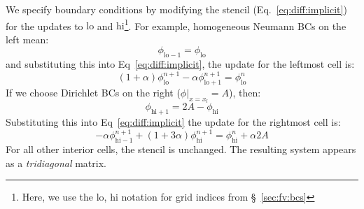 We specify boundary conditions by modifying the stencil
(Eq.~\ref{eq:diff:implicit}) for the updates to $\mathrm{lo}$ and
$\mathrm{hi}$\footnote{Here, we use the $\mathrm{lo}$, $\mathrm{hi}$
  notation for grid indices from \S~\ref{sec:fv:bcs}}.  For example, homogeneous
Neumann BCs on the left mean:
\begin{equation}
\phi_\mathrm{lo-1} = \phi_\mathrm{lo}
\end{equation}
and substituting this into Eq~\ref{eq:diff:implicit}, the update for the leftmost cell is:
\begin{equation}
 (1 + \alpha) \phi_\mathrm{lo}^{n+1} -\alpha \phi_\mathrm{lo+1}^{n+1}  = 
  \phi_\mathrm{lo}^n
\end{equation}
If we choose Dirichlet BCs on the right ($\phi |_{x=x_l} = A$), then:
\begin{equation}
\phi_\mathrm{hi+1} = 2 A - \phi_\mathrm{hi}
\end{equation}
Substituting this into Eq~\ref{eq:diff:implicit} the update for the rightmost cell is:
\begin{equation}
- \alpha \phi_\mathrm{hi-1}^{n+1} + (1 + 3\alpha) \phi_\mathrm{hi}^{n+1}  =
  \phi_\mathrm{hi}^n + \alpha 2 A
\end{equation}
For all other interior cells, the stencil is unchanged.  The resulting
system appears as a {\em tridiagonal} matrix.
